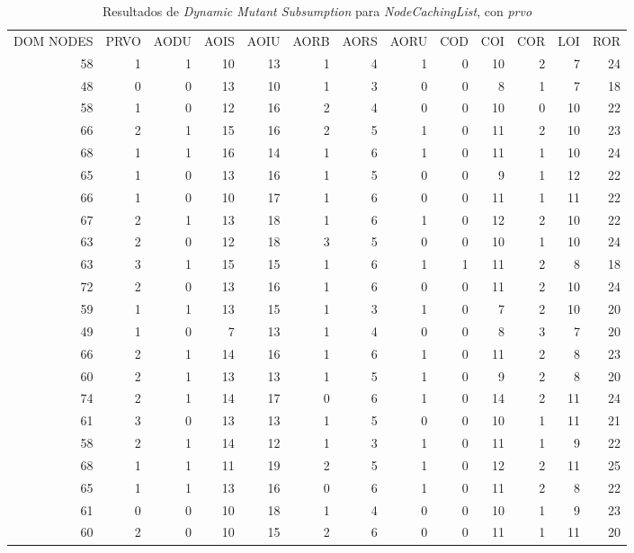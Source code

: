 \begin{table}[]
	\caption{Resultados de \emph{Dynamic Mutant Subsumption} para \emph{NodeCachingList}, con \emph{prvo}}
	\label{tables.results.subsumption.ncll.prvo}
	\centering
	\scriptsize
	\def\arraystretch{0.95}
	\setlength\tabcolsep{0.5mm}
	\begin{tabular}{rrrrrrrrrrrrr}
	DOM NODES & PRVO & AODU & AOIS & AOIU & AORB & AORS & AORU & COD & COI & COR & LOI & ROR \\
	58 & 1 & 1 & 10 & 13 & 1 & 4 & 1 & 0 & 10 & 2 & 7 & 24 \\
	48 & 0 & 0 & 13 & 10 & 1 & 3 & 0 & 0 & 8 & 1 & 7 & 18 \\
	58 & 1 & 0 & 12 & 16 & 2 & 4 & 0 & 0 & 10 & 0 & 10 & 22 \\
	66 & 2 & 1 & 15 & 16 & 2 & 5 & 1 & 0 & 11 & 2 & 10 & 23 \\
	68 & 1 & 1 & 16 & 14 & 1 & 6 & 1 & 0 & 11 & 1 & 10 & 24 \\
	65 & 1 & 0 & 13 & 16 & 1 & 5 & 0 & 0 & 9 & 1 & 12 & 22 \\
	66 & 1 & 0 & 10 & 17 & 1 & 6 & 0 & 0 & 11 & 1 & 11 & 22 \\
	67 & 2 & 1 & 13 & 18 & 1 & 6 & 1 & 0 & 12 & 2 & 10 & 22 \\
	63 & 2 & 0 & 12 & 18 & 3 & 5 & 0 & 0 & 10 & 1 & 10 & 24 \\
	63 & 3 & 1 & 15 & 15 & 1 & 6 & 1 & 1 & 11 & 2 & 8 & 18 \\
	72 & 2 & 0 & 13 & 16 & 1 & 6 & 0 & 0 & 11 & 2 & 10 & 24 \\
	59 & 1 & 1 & 13 & 15 & 1 & 3 & 1 & 0 & 7 & 2 & 10 & 20 \\
	49 & 1 & 0 & 7 & 13 & 1 & 4 & 0 & 0 & 8 & 3 & 7 & 20 \\
	66 & 2 & 1 & 14 & 16 & 1 & 6 & 1 & 0 & 11 & 2 & 8 & 23 \\
	60 & 2 & 1 & 13 & 13 & 1 & 5 & 1 & 0 & 9 & 2 & 8 & 20 \\
	74 & 2 & 1 & 14 & 17 & 0 & 6 & 1 & 0 & 14 & 2 & 11 & 24 \\
	61 & 3 & 0 & 13 & 13 & 1 & 5 & 0 & 0 & 10 & 1 & 11 & 21 \\
	58 & 2 & 1 & 14 & 12 & 1 & 3 & 1 & 0 & 11 & 1 & 9 & 22 \\
	68 & 1 & 1 & 11 & 19 & 2 & 5 & 1 & 0 & 12 & 2 & 11 & 25 \\
	65 & 1 & 1 & 13 & 16 & 0 & 6 & 1 & 0 & 11 & 2 & 8 & 22 \\
	61 & 0 & 0 & 10 & 18 & 1 & 4 & 0 & 0 & 10 & 1 & 9 & 23 \\
	60 & 2 & 0 & 10 & 15 & 2 & 6 & 0 & 0 & 11 & 1 & 11 & 20 \\

\end{tabular}
\end{table}
